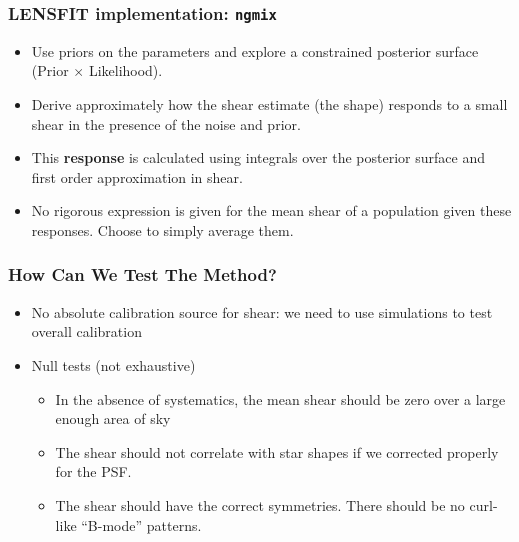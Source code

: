 \documentclass{beamer}
\newcommand{\ngmix}{\texttt{ngmix}}
\begin{document}
\frame
{
    \frametitle{LENSFIT implementation: \ngmix}

    \begin{itemize}

        \item Use priors on the parameters and explore a constrained posterior
            surface (Prior $\times$ Likelihood).

        \item Derive approximately how the shear estimate (the shape) responds
            to a small shear in the presence of the noise and prior.
            
        \item This {\bf response} is calculated using integrals over the
            posterior surface and first order approximation in shear.


        \item No rigorous expression is given for the mean shear of a
            population given these responses.  Choose to simply average them.
        
    \end{itemize}
}

\frame
{
    \frametitle{How Can We Test The Method?}

    \begin{itemize}

        \item No absolute calibration source for shear: we need to use
            simulations to test overall calibration

        \item Null tests (not exhaustive)

            \begin{itemize}

                \item In the absence of systematics, the mean shear should be
                    zero over a large enough area of sky

                \item The shear should not correlate with star shapes if we
                    corrected properly for the PSF.

                \item The shear should have the correct symmetries.  There
                    should be no curl-like ``B-mode'' patterns.

            \end{itemize}

    \end{itemize}
}
\end{document}
